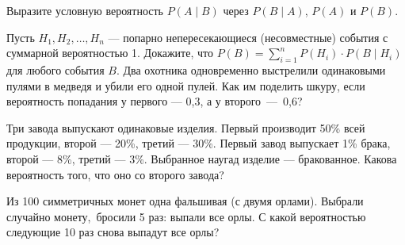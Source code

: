 \documentclass[a4paper,11pt]{article}
\begin{document}
Выразите условную вероятность $P(A\mid B)$ через $P(B\mid A)$, $P(A)$ и $P(B)$.

    Пусть $H_1,H_2,\ldots,H_n$ --- попарно непересекающиеся (несовместные) события с суммарной вероятностью 1.
    Докажите, что $P(B)=\sum\limits_{i=1}^{n}P(H_i)\cdot P(B\mid H_i)$ для любого события $B$.
\vspace{-1mm}
Два охотника одновременно выстрелили одинаковыми пулями в медведя и убили его одной пулей.
Как %
им поделить шкуру, если вероятность попадания у первого --- 0{,}3,
а у второго~---~0{,}6?




Три завода выпускают одинаковые изделия. Первый производит 50\%
всей продукции, второй --- 20\%, третий --- 30\%.
Первый завод выпускает 1\% брака, второй --- 8\%, третий --- 3\%.
Выбранное наугад изделие --- бракованное. Какова вероятность
того, что оно %
со второго завода?


Из 100 симметричных монет одна фальшивая
(с двумя орлами). Выбрали случайно монету,~бросили 5
раз: выпали все орлы. С какой вероятностью следующие 10 раз снова выпадут все орлы?
\end{document}
